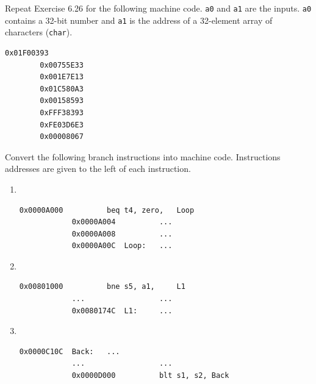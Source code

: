 \documentclass[12pt]{article}
\newenvironment{ex}[2][Exercise]{\begin{trivlist}
		\item[\hskip \labelsep {\bfseries #1}\hskip \labelsep {\bfseries #2.}]}{\end{trivlist}}
\begin{document}
\begin{ex}{6.27}
	Repeat Exercise 6.26 for the following machine code. \texttt{a0} and \texttt{a1} are the
	inputs. \texttt{a0} contains a 32-bit number and \texttt{a1} is the address of a 32-element
	array of characters (\texttt{char}).
	\begin{lstlisting}[language={}]
		0x01F00393
		0x00755E33
		0x001E7E13
		0x01C580A3
		0x00158593
		0xFFF38393
		0xFE03D6E3
		0x00008067
	\end{lstlisting}
\end{ex}

\begin{ex}{6.28}
	Convert the following branch instructions into machine code. Instructions addresses are
	given to the left of each instruction.
	\begin{enumerate}[label=(\alph*)]
		\item
		\
		\begin{lstlisting}[language={}]
			0x0000A000			beq	t4,	zero,	Loop
			0x0000A004			...
			0x0000A008			...
			0x0000A00C	Loop:	...
		\end{lstlisting}
		\item 
		\
		\begin{lstlisting}[language={}]
			0x00801000			bne	s5,	a1,		L1
			...					...
			0x0080174C	L1:		...
		\end{lstlisting}
		\item
		\
		\begin{lstlisting}[language={}]
			0x0000C10C	Back:	...
			...					...
			0x0000D000			blt	s1,	s2,	Back
		\end{lstlisting}
	\end{enumerate}
\end{ex}
\end{document}

